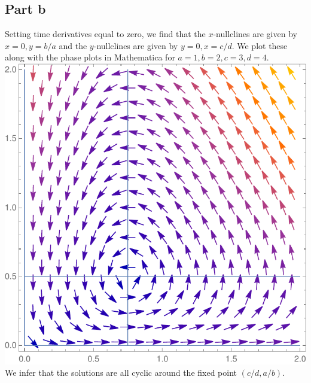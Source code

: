\documentclass{article}
\begin{document}
\subsection{Part b}
Setting time derivatives equal to zero, we find that the $x$-nullclines are given by $x=0,y=b/a$ and the $y$-nullclines are given by $y=0,x=c/d$. We plot these along with the phase plots in Mathematica for $a=1,b=2,c=3,d=4$.\\
\includegraphics[scale=0.7]{phase_plot.pdf}\\
We infer that the solutions are all cyclic around the fixed point $(c/d,a/b)$.
\end{document}
